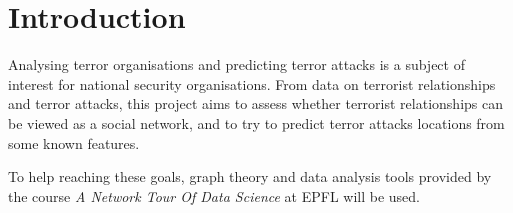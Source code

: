 \section{Introduction}
\label{sec:Introduction}
Analysing terror organisations and predicting terror attacks is a subject of interest for national security organisations. From data on  terrorist relationships and terror attacks, this project aims to assess whether terrorist relationships can be viewed as a social network, and to try to predict terror attacks locations from some known features. 

To help reaching these goals, graph theory and data analysis tools  provided by the course \textit{A Network Tour Of Data Science} at EPFL will be used.

